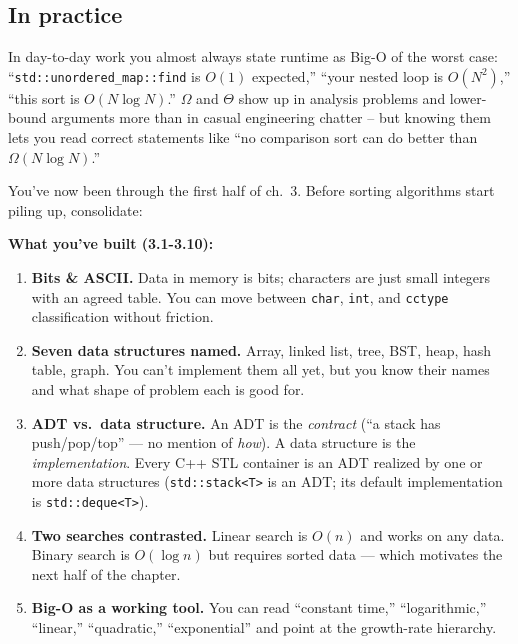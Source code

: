 \documentclass[11pt]{article}
\begin{document}
\subsection{In practice}

\begin{notebox}
In day-to-day work you almost always state runtime as Big-O of the
worst case: ``\texttt{std::unordered\_map::find} is $O(1)$ expected,''
``your nested loop is $O(N^2)$,'' ``this sort is $O(N \log N)$.''
$\Omega$ and $\Theta$ show up in analysis problems and lower-bound
arguments more than in casual engineering chatter -- but knowing
them lets you read correct statements like ``no comparison sort can
do better than $\Omega(N \log N)$.''
\end{notebox}

\begin{ideabox}
You've now been through the first half of ch.~3. Before sorting algorithms
start piling up, consolidate:

\medskip
\textbf{What you've built (3.1-3.10):}
\begin{enumerate}
    \item \textbf{Bits \& ASCII.} Data in memory is bits; characters are
    just small integers with an agreed table. You can move between
    \texttt{char}, \texttt{int}, and \texttt{cctype} classification
    without friction.
    \item \textbf{Seven data structures named.} Array, linked list, tree,
    BST, heap, hash table, graph. You can't implement them all yet, but
    you know their names and what shape of problem each is good for.
    \item \textbf{ADT vs.\ data structure.} An ADT is the \emph{contract}
    (``a stack has push/pop/top'' — no mention of \emph{how}). A data
    structure is the \emph{implementation}. Every C++ STL container is
    an ADT realized by one or more data structures
    (\texttt{std::stack<T>} is an ADT; its default implementation is
    \texttt{std::deque<T>}).
    \item \textbf{Two searches contrasted.} Linear search is $O(n)$ and
    works on any data. Binary search is $O(\log n)$ but requires sorted
    data — which motivates the next half of the chapter.
    \item \textbf{Big-O as a working tool.} You can read ``constant
    time,'' ``logarithmic,'' ``linear,'' ``quadratic,'' ``exponential''
    and point at the growth-rate hierarchy.
\end{enumerate}


\end{ideabox}
\end{document}
